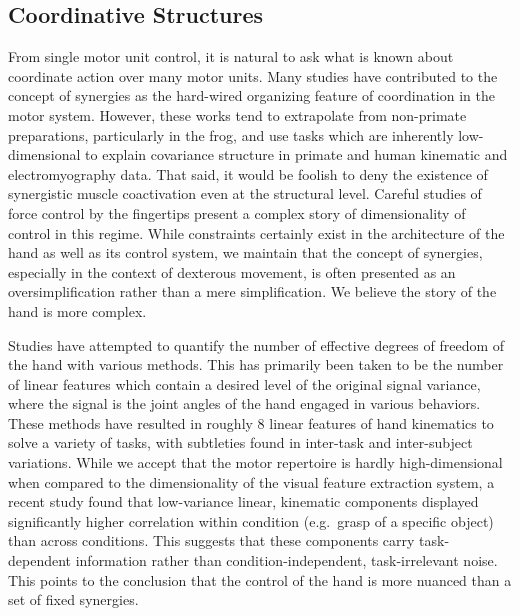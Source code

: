 \documentclass[../main.tex]{subfiles}
\begin{document}
\subsection{Coordinative Structures}\label{coordinative-structures}

From single motor unit control, it is natural to ask what is known about coordinate action over many motor units. Many studies have contributed to the concept of synergies as the hard-wired organizing feature of coordination in the motor system\cite{mussa-ivaldiMotorLearningCombination2000b,DAvella2003}. However, these works tend to extrapolate from non-primate preparations, particularly in the frog, and use tasks which are inherently low-dimensional to explain covariance structure in primate and human kinematic and electromyography data\cite{giszterMotorPrimitivesNew2015,gaoTheoryMultineuronalDimensionality2017}. That said, it would be foolish to deny the existence of synergistic muscle coactivation even at the structural level. Careful studies of force control by the fingertips present a complex story of dimensionality of control in this regime\cite{raczSpatiotemporalAnalysisReveals2013}. While constraints certainly exist in the architecture of the hand as well as its control system, we maintain that the concept of synergies, especially in the context of dexterous movement, is often presented as an oversimplification rather than a mere simplification. We believe the story of the hand is more complex.

Studies have attempted to quantify the number of effective degrees of freedom of the hand with various methods. This has primarily been taken to be the number of linear features which contain a desired level of the original signal variance, where the signal is the joint angles of the hand engaged in various behaviors\cite{Ingram2009,TodorovDimensionality2005}. These methods have resulted in roughly 8 linear features of hand kinematics to solve a variety of tasks, with subtleties found in inter-task and inter-subject variations. While we accept that the motor repertoire is hardly high-dimensional when compared to the dimensionality of the visual feature extraction system, a recent study found that low-variance linear, kinematic components displayed significantly higher correlation within condition (e.g.~grasp of a specific object) than across conditions. This suggests that these components carry task-dependent information rather than condition-independent, task-irrelevant noise. This points to the conclusion that the control of the hand is more nuanced than a set of fixed synergies\cite{yanUnexpectedComplexityEveryday2020}.
\end{document}
